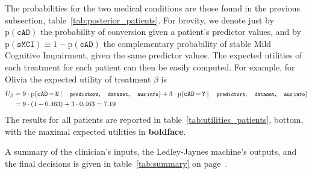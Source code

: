 \documentclass[utf8]{FrontiersinHarvard} %
\newcommand*{\mo}[1][=]{\mathord{\,#1\,}}
\newcommand*{\p}{\mathrm{p}}%
\renewcommand*{\|}[1][]{\nonscript\:#1\vert\nonscript\:\mathopen{}}
\newcommand*{\eU}{\bar{U}}
\newcommand*{\cad}{\texttt{cAD}}
\newcommand*{\smci}{\texttt{sMCI}}
\newcommand*{\yes}{\texttt{Y}}
\newcommand*{\no}{\texttt{N}}
\newcommand*{\predictors}{\texttt{\footnotesize predictors}}
\newcommand*{\dataset}{\texttt{\footnotesize dataset}}
\newcommand*{\auxinfo}{\texttt{\footnotesize aux\,info}}
\newcommand*{\mci}{Mild Cognitive Impairment}
\newcommand*{\ljm}{Ledley-Jaynes machine}
\begin{document}
The probabilities for the two medical conditions are those found in the previous subsection, table~\ref{tab:posterior_patients}. For brevity, we denote just by $\p(\cad)$ the probability of conversion given a patient's predictor values, and by $\p(\smci)\equiv 1- \p(\cad)$ the complementary probability of stable \mci, given the same predictor values. The expected utilities of each treatment for each patient can then be easily computed. For example, for Olivia the expected utility of treatment $\beta$ is
\begin{equation}
  \label{eq:utility_olivia_example}
  \begin{split}
  \eU_{\beta} &=
  9 \cdot \p(\cad\mo\no \| \predictors,\dataset,\auxinfo) +
  3 \cdot \p(\cad\mo\yes \| \predictors,\dataset,\auxinfo)
  \\&=  9 \cdot (1-0.463) + 3 \cdot 0.463 = 7.19
\end{split}
\end{equation}
The results for all patients are reported in table~\ref{tab:utilities_patients}, bottom, with the maximal expected utilities in \textbf{boldface}.

A summary of the clinician's inputs, the \ljm's outputs, and the final decisions is given in table~\ref{tab:summary} on page~\pageref{tab:summary}.



 

\end{document}
